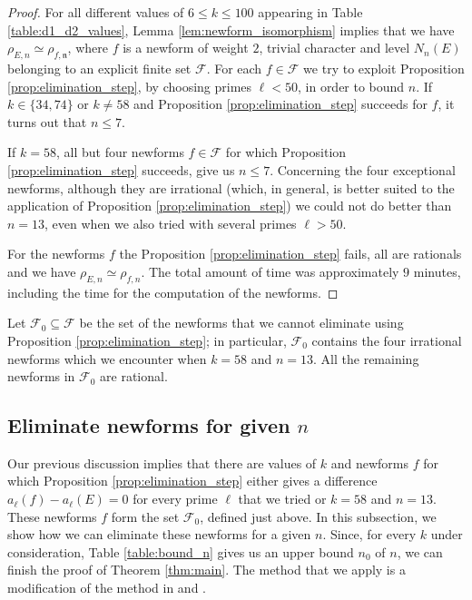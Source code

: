 \documentclass[12pt]{amsart}
\numberwithin{equation}{section}
\theoremstyle{definition}
\theoremstyle{remark}
\newcommand{\fn}{\mathfrak{n}}
\newcommand{\rhoE}{\rho_{E,n}}
\newcommand{\rhof}{\rho_{f,\fn}}
\newcommand{\rhofn}{\rho_{f,n}}
\begin{document}
\begin{proof}
For all different values of $6\leq k\leq 100$ appearing in Table \ref{table:d1_d2_values}, Lemma \ref{lem:newform_isomorphism} implies that we have $\rhoE\simeq\rhof$, where $f$ is a newform of weight $2$, trivial character and level $N_n(E)$ belonging to an explicit finite set $\mathcal{F}$. For each $f\in\mathcal{F}$ we try to exploit Proposition \ref{prop:elimination_step}, by choosing primes $\ell< 50$, in order to bound $n$. If $k\in\{34,74\}$ or $k\ne 58$ and Proposition \ref{prop:elimination_step} succeeds for $f$, it turns out that $n\le 7$.

If $k=58$, all but four newforms $f\in\mathcal{F}$ for which Proposition \ref{prop:elimination_step} succeeds, give us $n\le 7$. Concerning the four exceptional newforms, although they are irrational (which, in general, is better suited to the application of Proposition \ref{prop:elimination_step}) we could not do better than $n=13$, even when we also tried with several primes $\ell>50$.

For the newforms $f$ the Proposition \ref{prop:elimination_step} fails, all are rationals and we have $\rhoE\simeq\rhofn$. The total amount of time was 
approximately $9$ minutes, including the time for the computation of the newforms.
\end{proof}
%

Let $\mathcal{F}_0\subseteq\mathcal{F}$ be the set of the newforms that we cannot eliminate using Proposition \ref{prop:elimination_step}; in particular, $\mathcal{F}_0$ contains the four irrational newforms which we encounter when $k=58$ and $n=13$. All the remaining newforms in $\mathcal{F}_0$ are rational.



\subsection{Eliminate newforms for given $n$}
%

Our previous discussion implies that there are values of $k$ and newforms $f$ for which Proposition \ref{prop:elimination_step} either gives a difference $a_\ell(f)- a_\ell(E)= 0$ for every prime $\ell$ that we tried or $k=58$ and $n=13$. These newforms $f$ form the set $\mathcal{F}_0$, defined just above. In this subsection, we show how we can eliminate these newforms for a given $n$. Since, for every $k$ under consideration, Table \ref{table:bound_n} gives us an upper bound $n_0$ of $n$, we can finish the proof of Theorem \ref{thm:main}. The method that we apply is a modification of the method in \cite[Section 8]{BugeaudMignotteSiksek06} and \cite{Kraus98}.
\end{document}
